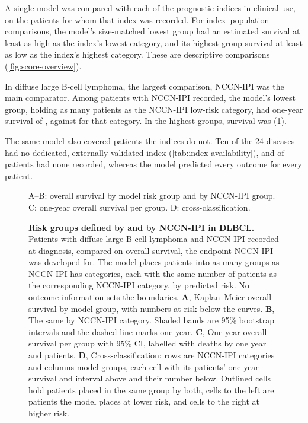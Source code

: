 \FloatBarrier
{}
A single model was compared with each of the  prognostic indices
in clinical use, on the patients for whom that index was recorded. For
 index--population comparisons, the model's size-matched
lowest group had an estimated survival at least as high as the index's lowest
category, and its highest group survival at least as low as the index's highest
category.  These are descriptive comparisons (\cref{fig:score-overview}).

In diffuse large B-cell lymphoma, the largest comparison, NCCN-IPI was the main
comparator. Among  patients with NCCN-IPI recorded, the model's
lowest group, holding as many patients as the NCCN-IPI low-risk category, had
one-year survival of , against  for
that category. In the highest groups, survival was 
(\cref{fig:risk-groups}).

The same model also covered patients the indices do not. Ten of the 24 diseases
had no dedicated, externally validated index (\cref{tab:index-availability}), and
 of patients had none recorded, whereas the model predicted
every outcome for every patient.

\begin{figure}[H]
    {A--B: overall survival by model risk group and by NCCN-IPI group. C:
    one-year overall survival per group. D: cross-classification.}
  \caption{\textbf{Risk groups defined by \opera{} and by NCCN-IPI in
  DLBCL.} Patients with diffuse large B-cell lymphoma and NCCN-IPI recorded at
  diagnosis, compared on overall survival, the endpoint NCCN-IPI was developed
  for. The model places patients into as many groups as NCCN-IPI has
  categories, each with the same number of patients as the corresponding
  NCCN-IPI category, by predicted risk. No outcome information sets the
  boundaries. \textbf{A}, Kaplan--Meier overall survival by model group, with
  numbers at risk below the curves. \textbf{B}, The same by NCCN-IPI category.
  Shaded bands are 95\% bootstrap intervals and the dashed line marks one year.
  \textbf{C}, One-year overall survival per group with 95\% CI, labelled with
  deaths by one year and patients. \textbf{D}, Cross-classification: rows are
  NCCN-IPI categories and columns model groups, each cell with its patients'
  one-year survival and interval above and their number below. Outlined cells
  hold patients placed in the same group by both, cells to the left are patients
  the model places at lower risk, and cells to the right at higher risk.}
  \label{fig:risk-groups}
\end{figure}

